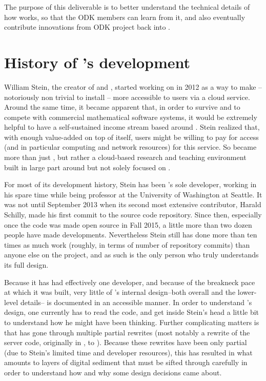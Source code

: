 \documentclass{deliverablereport}
\renewcommand{\SMC}{\software{SMC}}
\begin{document}
The purpose of this deliverable is to better understand the technical details
of how \SMC works, so that the ODK members can learn from it, and also
eventually contribute innovations from ODK project back into \SMC.

\section{History of \SMC's development}

William Stein, the creator of \Sage and \SMC, started working on \SMC in 2012
as a way to make \Sage -- notoriously non trivial to install -- more accessible to
users via a cloud service.  Around the same time, it became apparent that, in
order to survive and to compete with commercial mathematical software systems,
it would be extremely helpful to have a self-sustained income stream based
around \Sage.  Stein realized that, with enough value-added on top of \Sage
itself, users might be willing to pay for access (and in particular computing
and network resources) for this service.  So \SMC became more than just \Sage,
but rather a cloud-based research and teaching environment built in large part
around but not solely focused on \Sage.

For most of its development history, Stein has been \SMC's sole developer,
working in his spare time while being professor at the University of Washington at
Seattle.  It was not until September 2013 when its second most extensive
contributor, Harald Schilly, made his first commit to the \SMC source code
repository.  Since then, especially once the code was made open source
in Fall 2015, a
little more than two dozen people have made developments. Nevertheless Stein
still has done more than ten times as much work (roughly, in terms of number of
repository commits) than anyone else on the project, and as such is the only
person who truly understands its full design.

Because it has had effectively one developer, and because of the breakneck pace
at which it was built, very little of \SMC's internal design--both overall and
the lower-level details-- is documented in an accessible manner.  In order to
understand \SMC's design, one currently has to read the code, and get inside
Stein's head a little bit to understand how he might have been thinking.
Further complicating matters is that \SMC has gone through multiple partial
rewrites (most notably a rewrite of the server code, originally in \Python, to
\JavaScript).  Because these rewrites have been only partial (due to Stein's
limited time and developer resources), this has resulted in what amounts to
layers of digital sediment that must be sifted through carefully in order
to understand how and why some design decisions came about.
\end{document}
